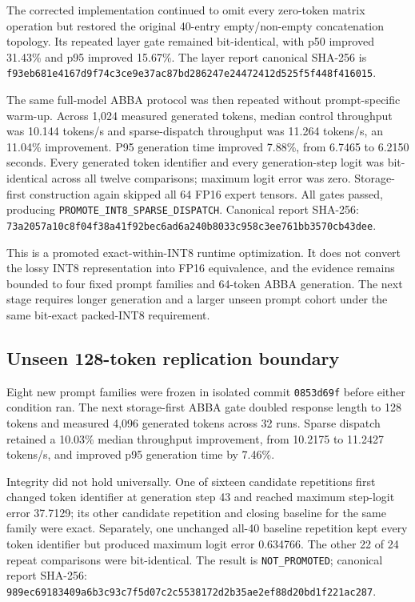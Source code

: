 The corrected implementation continued to omit every zero-token matrix
operation but restored the original 40-entry empty/non-empty concatenation
topology. Its repeated layer gate remained bit-identical, with p50 improved
31.43\% and p95 improved 15.67\%. The layer report canonical SHA-256 is
\texttt{f93eb681e4167d9f74c3ce9e37ac87bd286247e24472412d525f5f448f416015}.

The same full-model ABBA protocol was then repeated without prompt-specific
warm-up. Across 1,024 measured generated tokens, median control throughput was
10.144 tokens/s and sparse-dispatch throughput was 11.264 tokens/s, an 11.04\%
improvement. P95 generation time improved 7.88\%, from 6.7465 to 6.2150 seconds.
Every generated token identifier and every generation-step logit was
bit-identical across all twelve comparisons; maximum logit error was zero.
Storage-first construction again skipped all 64 FP16 expert tensors. All gates
passed, producing \texttt{PROMOTE\_INT8\_SPARSE\_DISPATCH}. Canonical report
SHA-256:
\texttt{73a2057a10c8f04f38a41f92bec6ad6a240b8033c958c3ee761bb3570cb43dee}.

This is a promoted exact-within-INT8 runtime optimization. It does not convert
the lossy INT8 representation into FP16 equivalence, and the evidence remains
bounded to four fixed prompt families and 64-token ABBA generation. The next
stage requires longer generation and a larger unseen prompt cohort under the
same bit-exact packed-INT8 requirement.

\subsection{Unseen 128-token replication boundary}

Eight new prompt families were frozen in isolated commit
\texttt{0853d69f} before either condition ran. The next storage-first ABBA gate
doubled response length to 128 tokens and measured 4,096 generated tokens across
32 runs. Sparse dispatch retained a 10.03\% median throughput improvement, from
10.2175 to 11.2427 tokens/s, and improved p95 generation time by 7.46\%.

Integrity did not hold universally. One of sixteen candidate repetitions first
changed token identifier at generation step 43 and reached maximum step-logit
error 37.7129; its other candidate repetition and closing baseline for the same
family were exact. Separately, one unchanged all-40 baseline repetition kept
every token identifier but produced maximum logit error 0.634766. The other 22
of 24 repeat comparisons were bit-identical. The result is
\texttt{NOT\_PROMOTED}; canonical report SHA-256:
\texttt{989ec69183409a6b3c93c7f5d07c2c5538172d2b35ae2ef88d20bd1f221ac287}.

